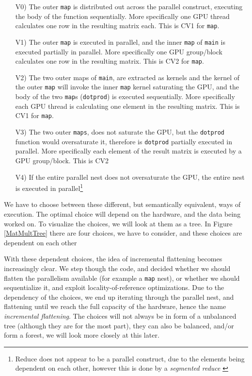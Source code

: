 \begin{itemize}
	\item[V0)] The outer \texttt{map} is distributed out across the parallel construct, executing the body of the function sequentially. More specifically one GPU thread calculates one row in the resulting matrix each. This is CV1 for \texttt{map}.
	\item[V1)] The outer \texttt{map} is executed in parallel, and the inner \texttt{map} of \texttt{main} is executed partially in parallel. More specifically one GPU group/block calculates one row in the resulting matrix. This is CV2 for \texttt{map}. 
	\item[V2)] The two outer maps of \texttt{main}, are extracted as kernels and the kernel of the outer \texttt{map} will invoke the inner \texttt{map} kernel saturating the GPU, and the body of the two \texttt{map}s (\texttt{dotprod}) is executed sequentially. More specifically each GPU thread is calculating one element in the resulting matrix. This is CV1 for \texttt{map}.
	\item[V3)] The two outer \texttt{maps}, does not saturate the GPU, but the \texttt{dotprod} function would oversaturate it, therefore is \texttt{dotprod} partially executed in parallel. More specifically each element of the result matrix is executed by a GPU group/block. This is CV2
	\item[V4)] If the entire parallel nest does not oversaturate the GPU, the entire nest is executed in parallel\footnote{Reduce does not appear to be a parallel construct, due to the elements being dependent on each other, however this is done by a \textit{segmented reduce} \cite{segred}}
\end{itemize} 
We have to choose between these different, but semantically equivalent, ways of execution. The optimal choice will depend on the hardware, and the data being worked on. To visualize the choices, we will look at them as a tree. In Figure \ref{MatMultTree} there are four choices, we have to consider, and these choices are dependent on each other
\begin{center}
	\centering 
	
	\label{MatMultTree}
\end{center}
With these dependent choices, the idea of incremental flattening becomes increasingly clear. We step though the code, and decided whether we should flatten the parallelism available (for example a \texttt{map} nest), or whether we should sequentialize it, and exploit locality-of-reference optimizations. Due to the dependency of the choices, we end up iterating through the parallel nest, and flattening until we reach the full capacity of the hardware, hence the name \textit{incremental flattening}. The choices will not always be in form of a unbalanced tree (although they are for the most part), they can also be balanced, and/or form a forest, we will look more closely at this later.


